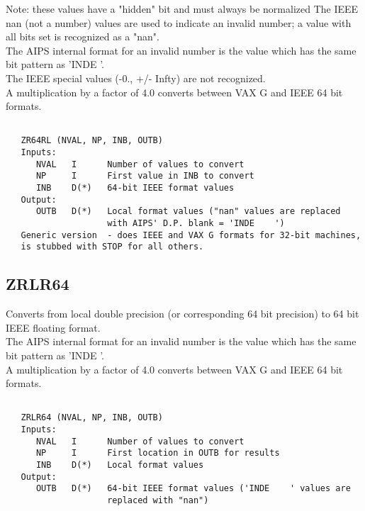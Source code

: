 Note: these values have a "hidden" bit and must always be normalized
The IEEE nan (not a number) values are used to indicate an invalid
number; a value with all bits set is recognized as a "nan".\\
The AIPS internal format for an invalid number is the value which
has the same bit pattern as 'INDE    '.\\
The IEEE special values (-0., +/- Infty) are not recognized.\\
A multiplication by a factor of 4.0 converts between VAX G and IEEE
64 bit formats.
\begin{verbatim}

   ZR64RL (NVAL, NP, INB, OUTB)
   Inputs:
      NVAL   I      Number of values to convert
      NP     I      First value in INB to convert
      INB    D(*)   64-bit IEEE format values
   Output:
      OUTB   D(*)   Local format values ("nan" values are replaced
                    with AIPS' D.P. blank = 'INDE    ')
   Generic version  - does IEEE and VAX G formats for 32-bit machines,
   is stubbed with STOP for all others.
\end{verbatim}


\subsection{ZRLR64}
Converts from local double precision (or corresponding 64 bit
precision) to 64 bit IEEE floating format.\\
The AIPS internal format for an invalid number is the value which
has the same bit pattern as 'INDE    '.\\
A multiplication by a factor of 4.0 converts between VAX G and IEEE
64 bit formats.
\begin{verbatim}

   ZRLR64 (NVAL, NP, INB, OUTB)
   Inputs:
      NVAL   I      Number of values to convert
      NP     I      First location in OUTB for results
      INB    D(*)   Local format values
   Output:
      OUTB   D(*)   64-bit IEEE format values ('INDE    ' values are
                    replaced with "nan")

\end{verbatim}

